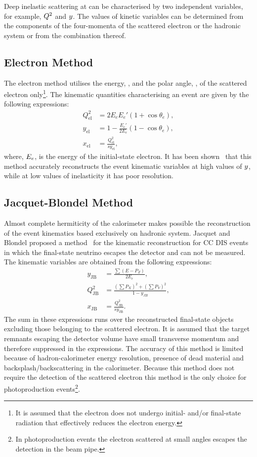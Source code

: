 Deep inelastic scattering at \hera can be characterised by two independent variables, for example, $\mbox{${Q^2}$}$ and $\mbox{${y}$}$. The values of kinetic variables can be determined from the components of the four-momenta of the scattered electron or the hadronic system or from the combination thereof.
\subsection{Electron Method}
\label{subsec:em}
The electron method utilises the energy, \eefin, and the polar angle, \thetae, of the scattered electron only\footnote{It is assumed that the electron does not undergo initial- and/or final-state radiation that effectively reduces the electron energy.}. The kinematic quantities characterising an event are given by the following expressions:
\begin{align}
	Q^2_\text{el} &= 2 E_e E_e' \left( 1 + \cos \theta_e \right),			\label{eq:q2el}							\\
	y_\text{el}      &= 1 - \frac{E_e'}{2 E_e}\left( 1 - \cos \theta_e \right),			\label{eq:yel} \\
	x_\text{el}      &= \frac{Q^2_\text{el}}{s y_\text{el}},			\label{eq:xel}
\end{align}
where, $\mbox{$E_e$}$, is the energy of the initial-state electron. It has been shown~\cite{nim:a426:583} that this method accurately reconstructs the event kinematic variables at high values of $\mbox{${y}$}$, while at low values of inelasticity it has poor resolution.
\subsection{Jacquet-Blondel Method}
\label{subsec:jb}
Almost complete hermiticity of the \zeus calorimeter makes  possible the reconstruction of the event kinematics based exclusively on hadronic system. Jacquet and Blondel proposed a method~\cite{proc:epfacility:1979:391} for the kinematic reconstruction for CC DIS events in which the final-state neutrino escapes the detector and can not be measured. The kinematic variables are obtained from the following expressions:
\begin{align}
	y_\text{JB}      &= \frac{\sum{ \left( E - P_{Z} \right) }}{2E_e},			\label{eq:ybj} \\
	Q^2_\text{JB} &= \frac{ \left( \sum{P_{X}} \right)^2 + \left( \sum{P_{Y}} \right)^2 }{1-y_{JB}},			\label{eq:q2jb}							\\
	x_\text{JB}      &= \frac{Q^2_\text{JB}}{s y_\text{JB}}.			\label{eq:xjb}
\end{align}
The sum in these expressions runs over the reconstructed final-state objects excluding those belonging to the scattered electron. It is assumed that the target remnants escaping the detector volume have small transverse momentum and therefore suppressed in the expressions. The accuracy of this method is limited because of hadron-calorimeter energy resolution, presence of dead material and backsplash/backscattering in the calorimeter. Because this method does not require the detection of the scattered electron this method is the only choice for photoproduction events\footnote{In photoproduction events the electron scattered at small angles escapes the detection in the beam pipe.}.
